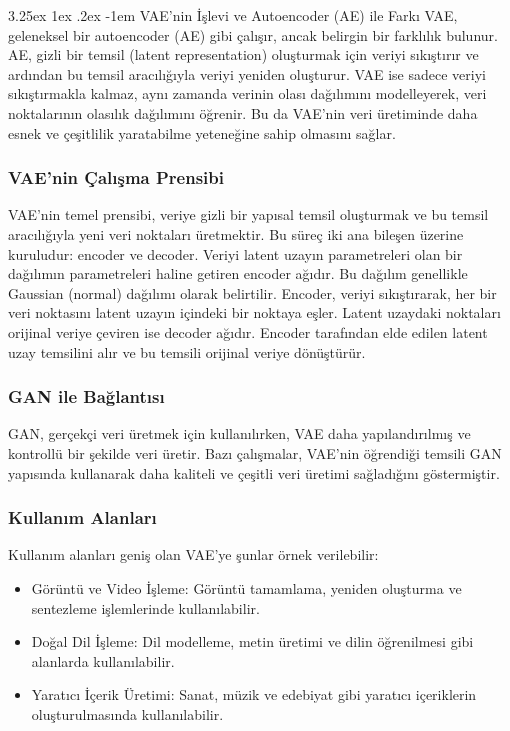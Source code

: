 \documentclass[12pt, a4paper]{article}
\makeatletter
\newcounter{subsubsubsection}[subsubsection]
\newcommand\subsubsubsection{\@startsection{subsubsubsection}{4}{\parindent}
	{3.25ex \@plus1ex \@minus .2ex}
	{-1em}
	{\normalfont\normalsize\bfseries}}
\makeatother
\begin{document}
			\subsubsubsection{VAE’nin İşlevi ve Autoencoder (AE) ile Farkı}
			VAE, geleneksel bir autoencoder (AE) gibi çalışır, ancak belirgin bir farklılık bulunur. AE, gizli bir temsil (latent representation) oluşturmak için veriyi sıkıştırır ve ardından bu temsil aracılığıyla veriyi yeniden oluşturur. VAE ise sadece veriyi sıkıştırmakla kalmaz, aynı zamanda verinin olası dağılımını modelleyerek, veri noktalarının olasılık dağılımını öğrenir. Bu da VAE’nin veri üretiminde daha esnek ve çeşitlilik yaratabilme yeteneğine sahip olmasını sağlar.
			
			\subsubsection{VAE’nin Çalışma Prensibi}
			VAE’nin temel prensibi, veriye gizli bir yapısal temsil oluşturmak ve bu temsil aracılığıyla yeni veri noktaları üretmektir. Bu süreç iki ana bileşen üzerine kuruludur: encoder ve decoder.
			\vspace*{1\baselineskip}
			Veriyi latent uzayın parametreleri olan bir dağılımın parametreleri haline getiren encoder ağıdır. Bu dağılım genellikle Gaussian (normal) dağılımı olarak belirtilir. Encoder, veriyi sıkıştırarak, her bir veri noktasını latent uzayın içindeki bir noktaya eşler.
			\vspace*{1\baselineskip}	
			Latent uzaydaki noktaları orijinal veriye çeviren ise decoder ağıdır. Encoder tarafından elde edilen latent uzay temsilini alır ve bu temsili orijinal veriye dönüştürür.
			
			\subsubsection{GAN ile Bağlantısı}
			GAN, gerçekçi veri üretmek için kullanılırken, VAE daha yapılandırılmış ve kontrollü bir şekilde veri üretir. Bazı çalışmalar, VAE’nin öğrendiği temsili GAN yapısında kullanarak daha kaliteli ve çeşitli veri üretimi sağladığını göstermiştir.
			
			\subsubsection{Kullanım Alanları}
			Kullanım alanları geniş olan VAE’ye şunlar örnek verilebilir:
			\begin{itemize}
				\item Görüntü ve Video İşleme: Görüntü tamamlama, yeniden oluşturma ve sentezleme işlemlerinde kullanılabilir.
				\item Doğal Dil İşleme: Dil modelleme, metin üretimi ve dilin öğrenilmesi gibi alanlarda kullanılabilir.
				\item 	Yaratıcı İçerik Üretimi: Sanat, müzik ve edebiyat gibi yaratıcı içeriklerin oluşturulmasında kullanılabilir.
			\end{itemize}
			
\end{document}
